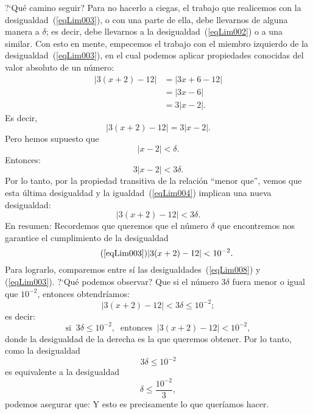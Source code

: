 ?`Qué camino seguir? Para no hacerlo a ciegas, el trabajo que realicemos con la
desigualdad~(\ref{eqLim003}), o con una parte de ella, debe llevarnos de alguna manera a $\delta$;
es decir, debe llevarnos a la desigualdad~(\ref{eqLim002}) o a una similar. Con esto en mente,
empecemos el trabajo con el miembro izquierdo de la desigualdad~(\ref{eqLim003}), en el cual
podemos aplicar propiedades conocidas del valor absoluto de un número:
\begin{align*}
|3(x + 2) - 12| &= |3x + 6 - 12| \\
&= |3x - 6| \\
&= 3|x - 2|.
\end{align*}
Es decir,
\begin{equation}
\label{eqLim004}%
|3(x + 2) - 12| = 3|x-2|.
\end{equation}
Pero hemos supuesto que
\[
|x - 2| < \delta.
\]
Entonces:
\[
3|x - 2| < 3\delta.
\]
Por lo tanto, por la propiedad transitiva de la relación ``menor que'', vemos que esta última
desigualdad y la igualdad~(\ref{eqLim004}) implican una nueva desigualdad:
\begin{equation}
\label{eqLim008}%
|3(x + 2) - 12| < 3\delta.
\end{equation}
En resumen:
%
Recordemos que queremos que el número $\delta$ que encontremos nos garantice el cumplimiento de la
desigualdad
\[
\tag{\ref{eqLim003}}%
|3(x + 2) - 12| < 10^{-2}.
\]
Para lograrlo, comparemos entre sí las desigualdades~(\ref{eqLim008}) y (\ref{eqLim003}). ?`Qué
podemos observar? Que si el número $3\delta$ fuera menor o igual que $10^{-2}$, entonces
obtendríamos:
\[
|3(x + 2) - 12| < 3\delta \leq 10^{-2};
\]
es decir:
\[
\text{si } \ 3\delta \leq 10^{-2}, \ \text{ entonces } \ |3(x + 2) - 12| < 10^{-2},
\]
donde la desigualdad de la derecha es la que queremos obtener. Por lo tanto, como la desigualdad
\[
3\delta \leq 10^{-2}
\]
es equivalente a la desigualdad
\[
\delta \leq \frac{10^{-2}}{3},
\]
podemos asegurar que:
 Y esto es precisamente lo que queríamos hacer.

